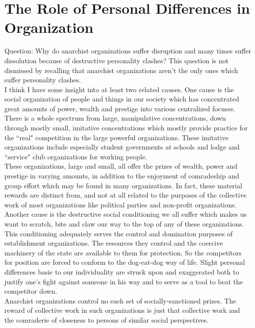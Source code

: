 \chapter{The Role of Personal Differences in Organization}

Question: Why do anarchist organizations suffer disruption and many times suffer dissolution because of destructive personality clashes? This question is not dismissed by recalling that anarchist organizations aren't the only ones which suffer personality clashes.\\
I think I have some insight into at least two related causes. One cause is the social organization of people and things in our society which has concentrated great amounts of power, wealth and prestige into various centralized focuses. There is a whole spectrum from large, manipulative concentrations, down through mostly small, imitative concentrations which mostly provide practice for the ``real" competition in the large powerful organizations. These imitative organizations include especially student governments at schools and lodge and ``service" club organizations for working people.\\
These organizations, large and small, all offer the prizes of wealth, power and prestige in varying amounts, in addition to the enjoyment of comradeship and group effort which may be found in many organizations. In fact, these material rewards are distinct from, and not at all related to the purposes of the collective work of most organizations like political parties and non-profit organizations.\\
Another cause is the destructive social conditioning we all suffer which makes us want to scratch, bite and claw our way to the top of any of these organizations. This conditioning adequately serves the control and domination purposes of establishment organizations. The resources they control and the coercive machinery of the state are available to them for protection. So the competitors for position are forced to conform to the dog-eat-dog way of life. Slight personal differences basic to our individuality are struck upon and exaggerated both to justify one's fight against someone in his way and to serve as a tool to beat the competitor down.\\
Anarchist organizations control no such set of socially-sanctioned prizes. The reward of collective work in such organizations is just that collective work and the comraderie of closeness to persons of similar social perspectives.\\
